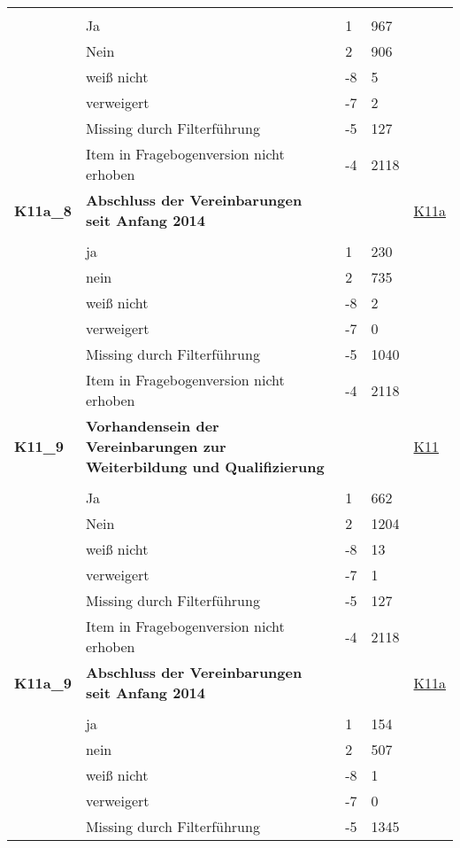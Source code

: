 \begin{longtable}{| L{2.5cm} | L{8.25cm}| C{1.5cm} | R{1.25cm} | C{2.25cm} |  }
   &  &  &  &  \\ 
   & Ja & 1 & 967 &  \\ 
   & Nein & 2 & 906 &  \\ 
   & weiß nicht & -8 & 5 &  \\ 
   & verweigert & -7 & 2 &  \\ 
   & Missing durch Filterführung & -5 & 127 &  \\ 
   & Item in Fragebogenversion nicht erhoben & -4 & 2118 &  \\ 
   \midrule
\textbf{K11a\_8}\label{var:suf:K11a:8} & \textbf{Abschluss der Vereinbarungen seit Anfang 2014} &  &  & \hyperref[K11a]{K11a} \\ 
   &  &  &  &  \\ 
   & ja & 1 & 230 &  \\ 
   & nein & 2 & 735 &  \\ 
   & weiß nicht & -8 & 2 &  \\ 
   & verweigert & -7 & 0 &  \\ 
   & Missing durch Filterführung & -5 & 1040 &  \\ 
   & Item in Fragebogenversion nicht erhoben & -4 & 2118 &  \\ 
   \midrule
\textbf{K11\_9}\label{var:suf:K11:9} & \textbf{Vorhandensein der Vereinbarungen zur Weiterbildung und Qualifizierung} &  &  & \hyperref[K11]{K11} \\ 
   &  &  &  &  \\ 
   & Ja & 1 & 662 &  \\ 
   & Nein & 2 & 1204 &  \\ 
   & weiß nicht & -8 & 13 &  \\ 
   & verweigert & -7 & 1 &  \\ 
   & Missing durch Filterführung & -5 & 127 &  \\ 
   & Item in Fragebogenversion nicht erhoben & -4 & 2118 &  \\ 
   \midrule
\textbf{K11a\_9}\label{var:suf:K11a:9} & \textbf{Abschluss der Vereinbarungen seit Anfang 2014} &  &  & \hyperref[K11a]{K11a} \\ 
   &  &  &  &  \\ 
   & ja & 1 & 154 &  \\ 
   & nein & 2 & 507 &  \\ 
   & weiß nicht & -8 & 1 &  \\ 
   & verweigert & -7 & 0 &  \\ 
   & Missing durch Filterführung & -5 & 1345 &  \\ 

\end{longtable}
